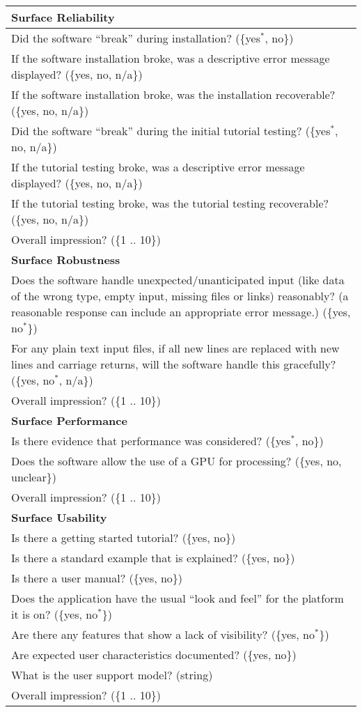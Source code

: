 \begin{longtable}{p{16cm}}
  \midrule
  \textbf{Surface Reliability}\\
  \midrule

  Did the software ``break'' during installation? (\{yes$^*$, no\})\\
  If the software installation broke, was a descriptive error message displayed? (\{yes, no, n/a\})\\
  If the software installation broke, was the installation recoverable? (\{yes, no, n/a\})\\
  Did the software ``break'' during the initial tutorial testing? (\{yes$^*$, no, n/a\})\\
  If the tutorial testing broke, was a descriptive error message displayed? (\{yes, no, n/a\})\\
  If the tutorial testing broke, was the tutorial testing recoverable? (\{yes, no, n/a\})\\
  Overall impression? (\{1 .. 10\})\\

  \midrule
  \textbf{Surface Robustness}\\
  \midrule

  Does the software handle unexpected/unanticipated input (like data of the wrong type, empty
input, missing files or links) reasonably? (a reasonable response can include
an appropriate error message.)  (\{yes, no$^*$\}) \\
  For any plain text input files, if all new lines are replaced with new lines
  and carriage returns, will the software handle this gracefully? (\{yes,
  no$^*$, n/a\})\\
  Overall impression? (\{1 .. 10\})\\

  \midrule
  \textbf{Surface Performance}\\
  \midrule

  Is there evidence that performance was considered? (\{yes$^*$, no\})\\
  Does the software allow the use of a GPU for processing? (\{yes, no, unclear\})\\
  Overall impression? (\{1 .. 10\})\\

  \midrule
  \textbf{Surface Usability}\\
  \midrule

  Is there a getting started tutorial? (\{yes, no\})\\
  Is there a standard example that is explained? (\{yes, no\})\\
  Is there a user manual? (\{yes, no\})\\
  Does the application have the usual ``look and feel'' for the platform it is
  on? (\{yes, no$^*$\})\\
  Are there any features that show a lack of visibility? (\{yes, no$^*$\})\\
  Are expected user characteristics documented? (\{yes, no\})\\
  What is the user support model? (string)\\
  Overall impression? (\{1 .. 10\})\\


\end{longtable}

